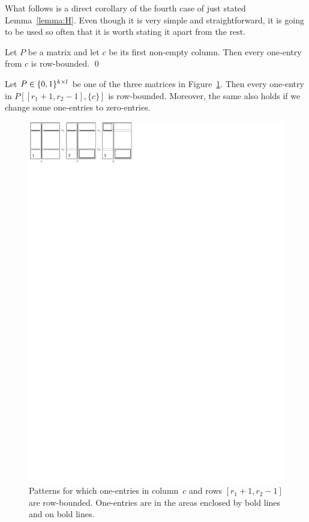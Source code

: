 What follows is a direct corollary of the fourth case of just stated Lemma~\ref{lemma:H}. Even though it is very simple and straightforward, it is going to be used so often that it is worth stating it apart from the rest.

\begin{lemma}
\label{lemma:First}
Let $P$ be a matrix and let $c$ be its first non-empty column. Then every one-entry from $c$ is row-bounded. \qed
\end{lemma}

\begin{lemma}
\label{lemma:I}
Let $P\in\{0,1\}^{k\times l}$ be one of the three matrices in Figure~\ref{fig:lemmaI}. Then every one-entry in $P[[r_1+1,r_2-1],\{c\}]$ is row-bounded. Moreover, the same also holds if we change some one-entries to zero-entries.

\begin{figure}[!ht]
\centering
\includegraphics[width=120mm]{img/lemmaI.pdf}
\caption{Patterns for which one-entries in column~$c$ and rows $[r_1+1,r_2-1]$ are row-bounded. One-entries are in the areas enclosed by bold lines and on bold lines.}
\label{fig:lemmaI}
\end{figure}
\end{lemma}
